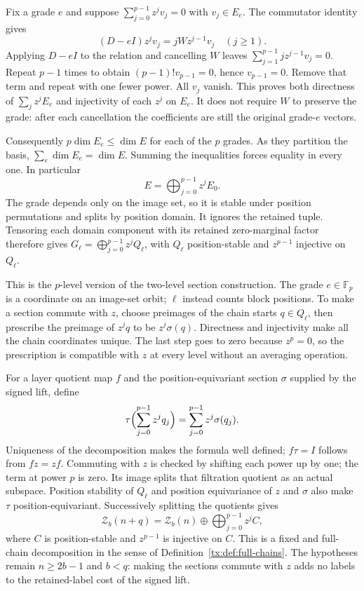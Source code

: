 \documentclass[11pt,a4paper,oneside,openany]{book}
\theoremstyle{definition}\newtheorem{definition}[theorem]{Definition}
\theoremstyle{remark}\newtheorem{remark}[theorem]{Remark}
\numberwithin{equation}{chapter}
\begin{document}
Fix a grade $e$ and suppose $\sum_{j=0}^{p-1}z^jv_j=0$ with
$v_j\in E_e$. The commutator identity gives
\[
 (D-eI)z^jv_j=jWz^{j-1}v_j\quad(j\ge1).
\]
Applying $D-eI$ to the relation and cancelling $W$ leaves
$\sum_{j=1}^{p-1}jz^{j-1}v_j=0$. Repeat $p-1$ times to obtain
$(p-1)!v_{p-1}=0$, hence $v_{p-1}=0$. Remove that term and repeat
with one fewer power. All $v_j$ vanish. This proves both directness
of $\sum_jz^jE_e$ and injectivity of each $z^j$ on $E_e$.
It does not require $W$ to preserve the grade: after each cancellation
the coefficients are still the original grade-$e$ vectors.

Consequently $p\dim E_e\le\dim E$ for each of the $p$ grades.
As they partition the basis, $\sum_e\dim E_e=\dim E$. Summing the
inequalities forces equality in every one. In particular
\[
                   E=\bigoplus_{j=0}^{p-1}z^jE_0.
\]
The grade depends only on the image set, so it is stable under
position permutations and splits by position domain. It ignores the
retained tuple. Tensoring each domain component with its retained
zero-marginal factor therefore gives
$G_\ell=\bigoplus_{j=0}^{p-1}z^jQ_\ell$, with $Q_\ell$
position-stable and $z^{p-1}$ injective on $Q_\ell$.

This is the $p$-level version of the two-level section construction.
The grade $e\in\mathbb F_p$ is a coordinate on an image-set orbit;
$\ell$ instead counts block positions. To make a section commute
with $z$, choose preimages of the chain starts $q\in Q_\ell$,
then prescribe the preimage of $z^jq$ to be $z^j\sigma(q)$.
Directness and injectivity make all the chain coordinates unique.
The last step goes to zero because $z^p=0$, so the prescription
is compatible with $z$ at every level without an averaging operation.

For a layer quotient map $f$ and the position-equivariant section
$\sigma$ supplied by the signed lift, define
\[
 \tau\Bigl(\sum_{j=0}^{p-1}z^jq_j\Bigr)
                  =\sum_{j=0}^{p-1}z^j\sigma(q_j).
\]
Uniqueness of the decomposition makes the formula well defined;
$f\tau=I$ follows from $fz=zf$. Commuting with $z$ is checked by
shifting each power up by one; the term at power $p$ is zero.
Its image splits that filtration quotient as an actual subspace.
Position stability of $Q_\ell$ and position equivariance of $z$ and
$\sigma$ also make $\tau$ position-equivariant.
Successively splitting the quotients gives
\begin{equation}\label{tx:eq:socsplitp}
\mathcal Z_b(n+q)=\mathcal Z_b(n)\oplus\bigoplus_{j=0}^{p-1}z^jC,
\end{equation}
where $C$ is position-stable and $z^{p-1}$ is injective on $C$.
This is a fixed and full-chain decomposition in the sense of
Definition~\ref{tx:def:full-chains}. The hypotheses remain
$n\ge2b-1$ and $b<q$: making the sections commute with $z$ adds no
labels to the retained-label cost of the signed lift.
\end{document}
